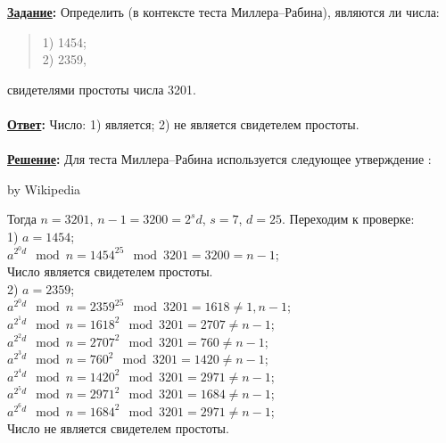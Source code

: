 \documentclass{article}
\begin{document}
\textbf{\uline{Задание}:} Определить (в контексте теста Миллера--Рабина), являются ли числа:
\begin{flushleft}
\begin{verse}
1) 1454;\\
2) 2359,\end{verse}
\end{flushleft}
свидетелями простоты числа 3201.\\
\\
\textbf{\uline{Ответ}:} Число: 1) является; 2) не является свидетелем простоты.\\
\\
\textbf{ \uline{Решение}: } Для теста Миллера--Рабина используется следующее утверждение : \\
\noindent{}
\begin{flushright}\footnotesize by Wikipedia \end{flushright}
Тогда $n=3201$, $n-1=3200=2^{s}d$, $s=7$, $d=25$. Переходим к проверке:\\
1) $a=1454$;\\
$a^{2^{0}d}\mod n=1454^{25}\mod 3201=3200=n-1$;\\
Число является свидетелем простоты.\\
2) $a=2359$;\\
$a^{2^{0}d}\mod n=2359^{25}\mod 3201=1618\not=1, n-1$;\\
$a^{2^{1}d}\mod n=1618^{2}\mod 3201=2707\not=n-1$;\\
$a^{2^{2}d}\mod n=2707^{2}\mod 3201=760\not=n-1$;\\
$a^{2^{3}d}\mod n=760^{2}\mod 3201=1420\not=n-1$;\\
$a^{2^{4}d}\mod n=1420^{2}\mod 3201=2971\not=n-1$;\\
$a^{2^{5}d}\mod n=2971^{2}\mod 3201=1684\not=n-1$;\\
$a^{2^{6}d}\mod n=1684^{2}\mod 3201=2971\not=n-1$;\\
Число не является свидетелем простоты.\\
\end{document}
